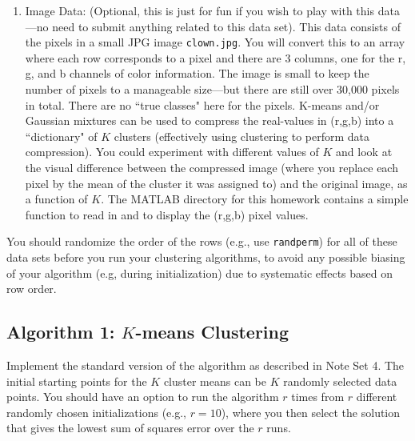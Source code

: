 \documentclass[11pt,psfig]{article}
\begin{document}
\begin{enumerate}
\item Image Data: (Optional, this is just for fun if you wish to play with this data---no need to
submit anything related to this data set). This data consists of the pixels in a small JPG image {\tt clown.jpg}. You will convert this to an array where each row corresponds to a pixel and there are 3 columns, one for the r, g, and b channels of color information. The image is small to keep the number of pixels to a manageable size---but there are still over 30,000 pixels in total. There are no ``true classes" here for the pixels. K-means and/or Gaussian mixtures can be used to compress the real-values in (r,g,b) into a ``dictionary" of $K$ clusters (effectively using clustering to perform data compression). You could experiment with different values of $K$ and look at the visual difference between the compressed image (where you replace each pixel by the mean of the cluster it was assigned to) and the original image, as a function of $K$.  The MATLAB directory for this homework contains a simple function to read in and  to display the (r,g,b) pixel values. 

\end{enumerate}
     
You should randomize the order of the rows (e.g., use {\tt randperm}) for all of these data sets before you run your clustering algorithms,  to avoid any possible biasing of your algorithm (e.g, during initialization) due to systematic effects based on row order.






\subsection*{Algorithm 1: $K$-means Clustering}
Implement the standard version of the algorithm as described in Note Set 4.
The initial starting points for the $K$ cluster means can be $K$ randomly selected data points. You should
 have an option to run the algorithm $r$ times from $r$ different
randomly chosen initializations (e.g., $r = 10$), where you then select the solution  that gives the lowest sum of squares error over the  $r$ runs.  
\end{document}
